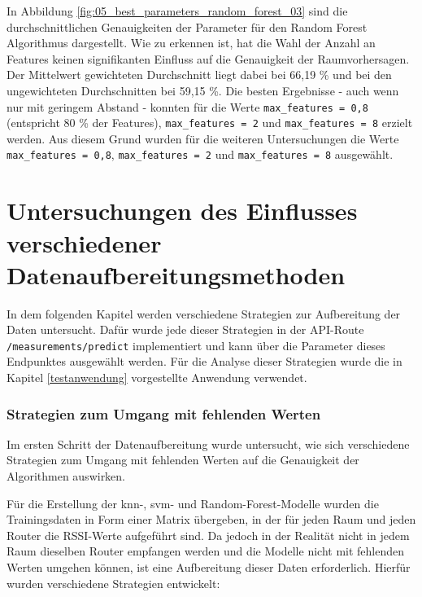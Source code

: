 In Abbildung \ref{fig:05_best_parameters_random_forest_03} sind die durchschnittlichen Genauigkeiten der Parameter für den Random Forest Algorithmus dargestellt. Wie zu erkennen ist, hat die Wahl der Anzahl an Features keinen signifikanten Einfluss auf die Genauigkeit der Raumvorhersagen. Der Mittelwert gewichteten Durchschnitt liegt dabei bei 66,19 \% und bei den ungewichteten Durchschnitten bei 59,15 \%. Die besten Ergebnisse - auch wenn nur mit geringem Abstand - konnten für die Werte \texttt{max\_features = 0,8} (entspricht 80 \% der Features), \texttt{max\_features = 2} und \texttt{max\_features = 8} erzielt werden. Aus diesem Grund wurden für die weiteren Untersuchungen die Werte \texttt{max\_features = 0,8}, \texttt{max\_features = 2} und \texttt{max\_features = 8} ausgewählt.

\section{Untersuchungen des Einflusses verschiedener Datenaufbereitungsmethoden} \label{datenaufbereitung}

In dem folgenden Kapitel werden verschiedene Strategien zur Aufbereitung der Daten untersucht. Dafür wurde jede dieser Strategien in der API-Route \texttt{/measurements/predict} implementiert und kann über die Parameter dieses Endpunktes ausgewählt werden. Für die Analyse dieser Strategien wurde die in Kapitel \ref{testanwendung} vorgestellte Anwendung verwendet.

\subsubsection{Strategien zum Umgang mit fehlenden Werten} \label{strategien}

Im ersten Schritt der Datenaufbereitung wurde untersucht, wie sich verschiedene Strategien zum Umgang mit fehlenden Werten auf die Genauigkeit der Algorithmen auswirken.

Für die Erstellung der \gls{knn}-, \gls{svm}- und Random-Forest-Modelle wurden die Trainingsdaten in Form einer Matrix übergeben, in der für jeden Raum und jeden Router die RSSI-Werte aufgeführt sind. Da jedoch in der Realität nicht in jedem Raum dieselben Router empfangen werden und die Modelle nicht mit fehlenden Werten umgehen können, ist eine Aufbereitung dieser Daten erforderlich. Hierfür wurden verschiedene Strategien entwickelt:

